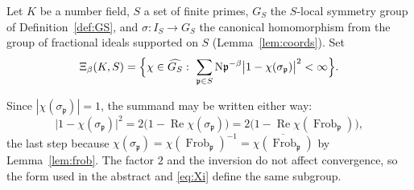 \documentclass[11pt]{amsart}
\numberwithin{equation}{section}
\theoremstyle{definition}
\theoremstyle{remark}
\newcommand{\Frob}{\operatorname{Frob}}
\newcommand{\Ns}{\mathrm{N}}
\newcommand{\pp}{\mathfrak{p}}
\begin{document}
Let $K$ be a number field, $S$ a set of finite primes, $G_S$ the $S$-local
symmetry group of Definition~\ref{def:GS}, and $\sigma:I_S\to G_S$ the
canonical homomorphism from the group of fractional ideals supported on $S$
(Lemma~\ref{lem:coords}). Set
\begin{equation}\label{eq:Xi}
\Xi_\beta(K,S)=\Bigl\{\chi\in\widehat{G_S}:\ \sum_{\pp\in S}\Ns\pp^{-\beta}\bigl|1-\chi(\sigma_\pp)\bigr|^2<\infty\Bigr\}.
\end{equation}

Since $|\chi(\sigma_\pp)|=1$, the summand may be written either way:
\begin{equation}\label{eq:twoforms}
\bigl|1-\chi(\sigma_\pp)\bigr|^2=2\bigl(1-\operatorname{Re}\chi(\sigma_\pp)\bigr)
=2\bigl(1-\operatorname{Re}\chi(\Frob_\pp)\bigr),
\end{equation}
the last step because $\chi(\sigma_\pp)=\chi(\Frob_\pp)^{-1}=\overline{\chi(\Frob_\pp)}$
by Lemma~\ref{lem:frob}. The factor $2$ and the inversion do not affect convergence, so
the form used in the abstract and \eqref{eq:Xi} define the same subgroup.
\end{document}
